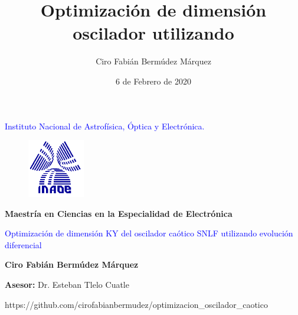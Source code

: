 \documentclass[10pt]{beamer}
\author{Ciro Fabián Bermúdez Márquez}
\title{Optimización de dimensión oscilador utilizando }
\institute{Benemérita Universidad Autónoma de Puebla} \date{6 de Febrero de 2020}
\begin{document}
	\begin{frame}[plain]
	
		
		\begin{center}
			\textcolor{blue}{Instituto Nacional de Astrofísica, Óptica y Electrónica.}
		\end{center}
		
		\begin{figure}[hbtp]
			\centering
			\includegraphics[width = 2.5cm]{logoinaoe.png} 
		\end{figure}
		
		\begin{center}
			\textbf{Maestría en Ciencias en la Especialidad de Electrónica}
		\end{center}
						
		\begin{center}
			\begin{Large}
			\textcolor{blue}{Optimización de dimensión KY del oscilador caótico SNLF  utilizando evolución diferencial}
			\end{Large}
		\end{center}
		
		\begin{center}
			\textbf{Ciro Fabián Bermúdez Márquez }
		\end{center}
		
		\begin{center}
			\textbf{Asesor:} Dr. Esteban Tlelo Cuatle
		\end{center}
	\end{frame}
	\begin{frame}
		\tableofcontents
	\end{frame}
	
	\begin{frame}
		\begin{center}
					https://github.com/cirofabianbermudez/optimizacion\_{}oscilador\_{}caotico
		\end{center}
	\end{frame}
\end{document}
